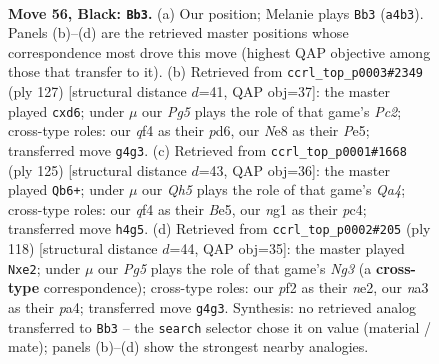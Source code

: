 \documentclass[11pt]{article}
\begin{document}
\clearpage

\begin{figure}[p]\centering
\begin{subfigure}{0.46\textwidth}\centering
\resizebox{\linewidth}{!}{%
\newchessgame
\chessboard[
  setfen={4n2k/8/p3P3/3P3p/b4Qpq/N7/5P2/5KN1 b - - 2 56},
  showmover=false,
  pgfstyle=straightmove, color=movearrow, markmove={a4-b3}
]}
\caption{}
\end{subfigure}\hfill
\begin{subfigure}{0.46\textwidth}\centering
\resizebox{\linewidth}{!}{%
\newchessgame
\chessboard[
  setfen={8/2p2k2/3P1p2/2p1p3/2q4N/P4Q2/1P6/1K6 b - - 0 64},
  showmover=false,
  pgfstyle=straightmove, color=movearrow, markmove={c7-d6}
]}
\caption{}
\end{subfigure}
\\[4pt]
\begin{subfigure}{0.46\textwidth}\centering
\resizebox{\linewidth}{!}{%
\newchessgame
\chessboard[
  setfen={1k6/1p6/p2P2p1/q2Pb3/2Pp4/1K6/1Q6/5R2 b - - 0 63},
  showmover=false,
  pgfstyle=straightmove, color=movearrow, markmove={a5-b6}
]}
\caption{}
\end{subfigure}\hfill
\begin{subfigure}{0.46\textwidth}\centering
\resizebox{\linewidth}{!}{%
\newchessgame
\chessboard[
  setfen={6kn/2Q5/4P2p/1p4pP/p7/6N1/4nqPK/8 w - - 3 60},
  showmover=false,
  pgfstyle=straightmove, color=movearrow, markmove={g3-e2}
]}
\caption{}
\end{subfigure}
\caption{\textbf{Move 56, Black: \texttt{Bb3}.} (a) Our position; Melanie plays \texttt{Bb3} (\texttt{a4b3}). Panels (b)--(d) are the retrieved master positions whose correspondence most drove this move (highest QAP objective among those that transfer to it). (b) Retrieved from \texttt{ccrl\_top\_p0003\#2349} (ply 127) [structural distance $d$=41, QAP obj=37]: the master played \texttt{cxd6}; under $\mu$ our \emph{Pg5} plays the role of that game's \emph{Pc2}; cross-type roles: our \emph{q}f4 as their \emph{p}d6, our \emph{N}e8 as their \emph{P}e5; transferred move \texttt{g4g3}. (c) Retrieved from \texttt{ccrl\_top\_p0001\#1668} (ply 125) [structural distance $d$=43, QAP obj=36]: the master played \texttt{Qb6+}; under $\mu$ our \emph{Qh5} plays the role of that game's \emph{Qa4}; cross-type roles: our \emph{q}f4 as their \emph{B}e5, our \emph{n}g1 as their \emph{p}c4; transferred move \texttt{h4g5}. (d) Retrieved from \texttt{ccrl\_top\_p0002\#205} (ply 118) [structural distance $d$=44, QAP obj=35]: the master played \texttt{Nxe2}; under $\mu$ our \emph{Pg5} plays the role of that game's \emph{Ng3} (a \textbf{cross-type} correspondence); cross-type roles: our \emph{p}f2 as their \emph{n}e2, our \emph{n}a3 as their \emph{p}a4; transferred move \texttt{g4g3}. Synthesis: no retrieved analog transferred to \texttt{Bb3} -- the \texttt{search} selector chose it on value (material / mate); panels (b)--(d) show the strongest nearby analogies.}
\label{fig:thought-m111}
\end{figure}
\end{document}
